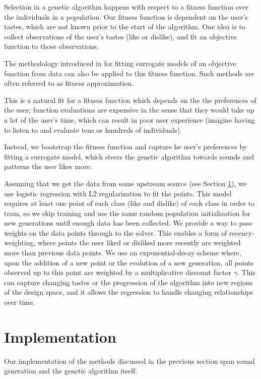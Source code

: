 \documentclass[conference]{IEEEtran}
\begin{document}
Selection in a genetic algorithm happens with respect to a fitness function
over the individuals in a population. Our fitness function is dependent on the
user's tastes, which are not known prior to the start of the algorithm. One
idea is to collect observations of the user's tastes (like or dislike), and fit
an objective function to those observations.

The methodology introduced in \cite{textbook} for fitting surrogate
models of an objective function from data can also be applied to this fitness
function. Such methods are often referred to as fitness approximation.

This is a natural fit for a fitness function which depends on the the
preferences of the user; function evaluations are expensive in the sense that
they would take up a lot of the user's time, which can result in poor user
experience (imagine having to listen to and evaluate tens or hundreds of
individuals).

Instead, we bootstrap the fitness function and capture he user's preferences by
fitting a surrogate model, which steers the genetic algorithm towards sounds
and patterns the user likes more.

Assuming that we get the data from some upstream source (see Section
\ref{implementation}), we use logistic regression with L2 regularization to
fit the points. This model requires at least one point of each class (like and
dislike) of each class in order to train, so we skip training and use the same
random population initialization for new generations until enough data has been
collected. We provide a way to pass weights on the data points through to the
solver. This enables a form of recency-weighting, where points the user liked
or disliked more recently are weighted more than previous data points. We use
an exponential-decay scheme where, upon the addition of a new point or the
evolution of a new generation, all points observed up to this point are
weighted by a multiplicative discount factor $\gamma$. This can
capture changing tastes or the progression of the algorithm into new regions of
the design space, and it allows the regression to handle changing relationships
over time.

\section{Implementation}\label{implementation}
Our implementation of the methods discussed in the previous section span sound
generation and the genetic algorithm itself.
\end{document}
